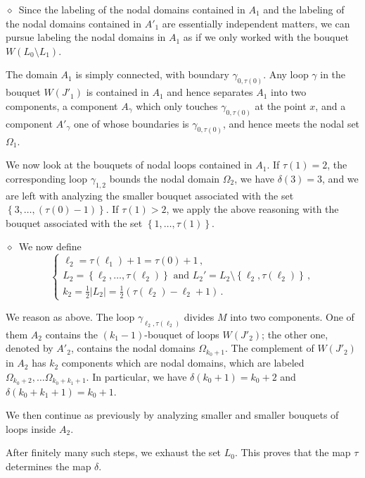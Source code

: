 \documentclass[12pt,a4paper]{amsart}
\theoremstyle{plain} %
\theoremstyle{definition}
\numberwithin{equation}{section}
\numberwithin{figure}{section}
\numberwithin{table}{section}
\newcommand{\sm}{\!\setminus\!}
\newcommand{\set}[1]{\left\lbrace #1 \right\rbrace}
\newcommand{\noid}{\noindent $\diamond$~}
\begin{document}
\noid Since the labeling of the nodal domains contained in $A_1$ and the labeling of the nodal domains contained in $A'_1$ are essentially independent matters, we can pursue labeling the nodal domains in $A_1$ as if we only worked with the bouquet $W(L_0\sm L_1)$. \smallskip

The domain $A_1$ is simply connected, with boundary $\gamma_{0,\tau(0)}$. Any loop $\gamma$ in the bouquet $W(J'_1)$ is contained in $A_1$ and hence separates $A_1$ into two components, a component $A_{\gamma}$ which only touches $\gamma_{0,\tau(0)}$ at the point $x$, and a component $A'_{\gamma}$ one of whose boundaries is $\gamma_{0,\tau(0)}$, and hence meets the nodal set $\Omega_1$. \smallskip

We now look at the bouquets of nodal loops contained in $A_1$. If $\tau(1) = 2$, the corresponding loop $\gamma_{1,2}$ bounds the nodal domain $\Omega_2$, we have $\delta(3) = 3$, and we are left with analyzing the smaller bouquet associated with the set $\set{3,\ldots,(\tau(0)-1)}$. If $\tau(1) > 2$, we apply the above reasoning with the bouquet associated with the set $ \set{1,\ldots,\tau(1)}$.\medskip


\noid We now define
%
\begin{equation}\label{E-llnd-12}
\left\{
\begin{array}{l}
\ell_2 = \tau(\ell_1)+1 = \tau(0) + 1\,,\\[5pt]
L_2 = \set{\ell_2,\ldots,\tau(\ell_2)} \text{~and~} L_2' = L_2\sm \set{\ell_2,\tau(\ell_2)}\,,\\[5pt]
k_2 = \frac{1}{2}|L_2| = \frac{1}{2}\left(\tau(\ell_2) - \ell_2+1 \right)\,.
\end{array}%
\right.
\end{equation}

We reason as above. The loop $\gamma_{\ell_2,\tau(\ell_2)}$ divides $M$ into two components. One of them $A_2$ contains the $(k_1-1)$-bouquet of loops $W(J'_2)$; the other one, denoted by $A'_2$, contains the nodal domains $\Omega_{k_0+1}$. The complement of $W(J'_2)$ in $A_2$ has $k_2$ components which are nodal domains, which are labeled $\Omega_{k_0+2}, \ldots \Omega_{k_0+k_1+1}$. In particular, we have $\delta(k_0+1) = k_0+2$ and $\delta(k_0+k_1+1) = k_0+1$.\smallskip

We then continue as previously by analyzing smaller and smaller bouquets of loops inside $A_2$.\medskip

After finitely many such steps, we exhaust the set $L_0$. This proves that the map $\tau$ determines the map $\delta$.\medskip
\end{document}
